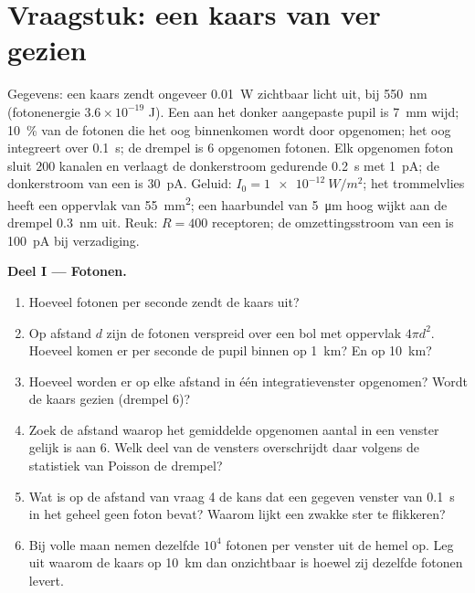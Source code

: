 \section{Vraagstuk: een kaars van ver gezien}

\begin{problem}
\label{pb:b3:sensory-systems:1}
Gegevens: een kaars zendt ongeveer \qty{0.01}{W} zichtbaar licht uit,
bij \qty{550}{nm} (fotonenergie $3.6\times 10^{-19}$ J). Een aan het
donker aangepaste pupil is \qty{7}{mm} wijd; \qty{10}{\%} van de
fotonen die het oog binnenkomen wordt door  opgenomen; het oog
integreert over \qty{0.1}{s}; de drempel is $6$ opgenomen fotonen. Elk
opgenomen foton sluit $200$ kanalen en verlaagt de donkerstroom
gedurende \qty{0.2}{s} met \qty{1}{pA}; de donkerstroom van een 
is \qty{30}{pA}. Geluid: $I_{0} =
\qty{1e-12}{W/m^2}$; het trommelvlies heeft een oppervlak van
\qty{55}{mm^2}; een haarbundel van \qty{5}{\micro m} hoog wijkt aan de
drempel \qty{0.3}{nm} uit. Reuk: $R = 400$ receptoren; de
omzettingsstroom van een  is \qty{100}{pA} bij verzadiging.

\medskip
\noindent\textbf{Deel I --- Fotonen.}
\begin{enumerate}
  \item Hoeveel fotonen per seconde zendt de kaars uit?
  \item Op afstand $d$ zijn de fotonen verspreid over een bol met
        oppervlak $4\pi d^{2}$. Hoeveel komen er per seconde de pupil
        binnen op \qty{1}{km}? En op \qty{10}{km}?
  \item Hoeveel worden er op elke afstand in één integratievenster
        opgenomen? Wordt de kaars gezien (drempel $6$)?
  \item Zoek de afstand waarop het gemiddelde opgenomen aantal in een
        venster gelijk is aan $6$. Welk deel van de vensters
        overschrijdt daar volgens de statistiek van Poisson de drempel?
  \item Wat is op de afstand van vraag 4 de kans dat een gegeven
        venster van \qty{0.1}{s} in het geheel geen foton bevat? Waarom
        lijkt een zwakke ster te flikkeren?
  \item Bij volle maan nemen dezelfde  $10^{4}$ fotonen per
        venster uit de hemel op. Leg uit waarom de kaars op
        \qty{10}{km} dan onzichtbaar is hoewel zij dezelfde fotonen
        levert.
\end{enumerate}


\end{problem}
